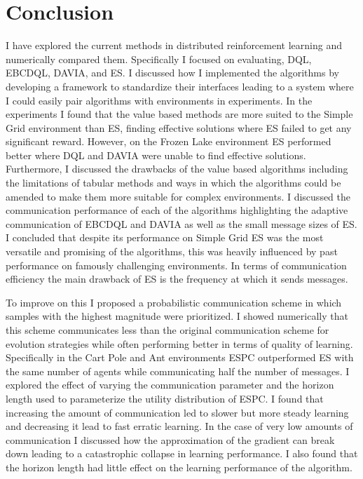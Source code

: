 \chapter{Conclusion}

I have explored the current methods in distributed reinforcement learning and numerically compared them. Specifically I focused on evaluating, DQL, EBCDQL, DAVIA, and ES. I discussed how I implemented the algorithms by developing a framework to standardize their interfaces leading to a system where I could easily pair algorithms with environments in experiments. In the experiments I found that the value based methods are more suited to the Simple Grid environment than ES, finding effective solutions where ES failed to get any significant reward. However, on the Frozen Lake environment ES performed better where DQL and DAVIA were unable to find effective solutions. Furthermore, I discussed the drawbacks of the value based algorithms including the limitations of tabular methods and ways in which the algorithms could be amended to make them more suitable for complex environments. I discussed the communication performance of each of the algorithms highlighting the adaptive communication of EBCDQL and DAVIA as well as the small message sizes of ES. I concluded that despite its performance on Simple Grid ES was the most versatile and promising of the algorithms, this was heavily influenced by past performance on famously challenging environments. In terms of communication efficiency the main drawback of ES is the frequency at which it sends messages.

To improve on this I proposed a probabilistic communication scheme in which samples with the highest magnitude were prioritized. I showed numerically that this scheme communicates less than the original communication scheme for evolution strategies while often performing better in terms of quality of learning. Specifically in the Cart Pole and Ant environments ESPC outperformed ES with the same number of agents while communicating half the number of messages.
I explored the effect of varying the communication parameter and the horizon length used to parameterize the utility distribution of ESPC. I found that increasing the amount of communication led to slower but more steady learning and decreasing it lead to fast erratic learning. In the case of very low amounts of communication I discussed how the approximation of the gradient can break down leading to a catastrophic collapse in learning performance. I also found that the horizon length had little effect on the learning performance of the algorithm.

